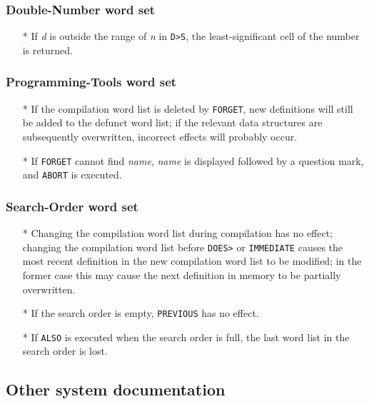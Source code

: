 \documentclass[english]{article}
\newcommand{\spic}[1]{{\it #1\/}}
\begin{document}
\subsubsection{Double-Number word set}

\begin{itemize}
\item[*]If \spic{d} is outside the range of \spic{n} in {\tt D>S}, the least-significant cell of the number is returned.
\end{itemize}

\subsubsection{Programming-Tools word set}

\begin{itemize}
\item[*]If the compilation word list is deleted by {\tt FORGET}, new definitions will still be added to the defunct word list; if the relevant data structures are subsequently overwritten, incorrect effects will probably occur.
\item[*]If {\tt FORGET} cannot find \textit{name}, \textit{name} is displayed followed by a question mark, and {\tt ABORT} is executed.
\end{itemize}

\subsubsection{Search-Order word set}
\begin{itemize}
\item[*]Changing the compilation word list during compilation has no effect; changing the compilation word list before {\tt DOES>} or {\tt IMMEDIATE} causes the most recent definition in the new compilation word list to be modified; in the former case this may cause the next definition in memory to be partially overwritten.
\item[*]If the search order is empty, {\tt PREVIOUS} has no effect.
\item[*]If {\tt ALSO} is executed when the search order is full, the last word list in the search order is lost.
\end{itemize}


\subsection{Other system documentation}
\end{document}
